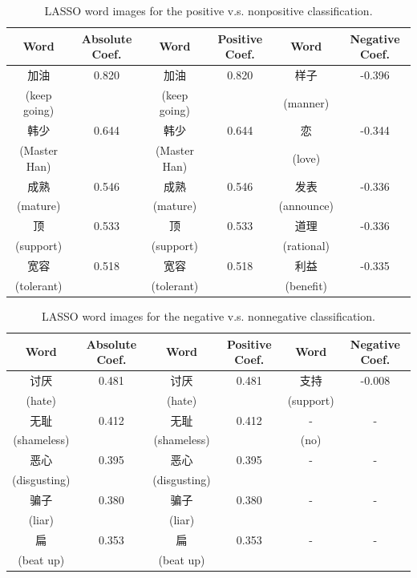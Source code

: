 \documentclass[11pt]{article}
\newcommand{\1}[1]{{\mathbf 1}\left\{#1\right\}}        %
\begin{document}
\begin{table}[!h]
\caption{LASSO word images for the positive v.s. nonpositive classification.}
\begin{center}
\begin{tabular}{|c|c||c|c||c|c|}
\hline
Word & Absolute Coef. & Word & Positive Coef. & Word & Negative Coef.\\ \hline \hline
加油 & 0.820 & 加油 & 0.820 & 样子 & -0.396\\
(keep going) & & (keep going) & & (manner) & \\\hline
韩少 & 0.644 & 韩少 & 0.644 & 恋 & -0.344\\
(Master Han) & & (Master Han) & & (love) & \\\hline
成熟 & 0.546 & 成熟 & 0.546 & 发表 & -0.336\\
(mature) & & (mature) & & (announce) & \\\hline
顶 & 0.533 & 顶 & 0.533 & 道理 & -0.336\\
(support) & & (support) & & (rational) & \\\hline
宽容 & 0.518 & 宽容 & 0.518 & 利益 & -0.335\\
(tolerant) & & (tolerant) & & (benefit) & \\\hline
\end{tabular}
\label{tb:lassopos}
\end{center}
\end{table}



\begin{table}[!h]
\caption{LASSO word images for the negative v.s. nonnegative classification.}
\begin{center}
\begin{tabular}{|c|c||c|c||c|c|}
\hline
Word & Absolute Coef. & Word & Positive Coef. & Word & Negative Coef.\\ \hline \hline
讨厌 & 0.481 & 讨厌 & 0.481 & 支持 & -0.008\\
(hate) & & (hate) & & (support) & \\\hline
无耻 & 0.412 & 无耻 & 0.412 & - & -\\
(shameless) & & (shameless) & & (no) & \\\hline
恶心 & 0.395 & 恶心 & 0.395 & - & -\\
(disgusting) & & (disgusting) & &  & \\\hline
骗子 & 0.380 & 骗子 & 0.380 & - & -\\
(liar) & & (liar) & &  & \\\hline
扁 & 0.353 & 扁 & 0.353 & - & -\\
(beat up) & & (beat up) & &  & \\\hline
\end{tabular}
\label{tb:lassoneg}
\end{center}
\end{table}
\end{document}
